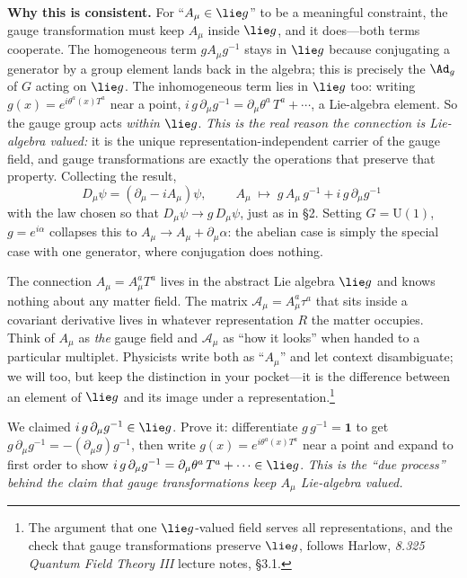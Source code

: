 \documentclass[11pt]{article}
\newcommand{\Uone}{\mathrm{U}(1)}
\begin{document}
\medskip
\noindent\textbf{Why this is consistent.} For ``$A_\mu\in\lie g$'' to be a meaningful
constraint, the gauge transformation must keep $A_\mu$ inside $\lie g$, and it does---both
terms cooperate. The homogeneous term $gA_\mu g^{-1}$ stays in $\lie g$ because
conjugating a generator by a group element lands back in the algebra; this is precisely
the  $\Ad_g$ of $G$ acting on $\lie g$. The inhomogeneous
term lies in $\lie g$ too: writing $g(x)=e^{i\theta^a(x)T^a}$ near a point,
$i\,g\,\partial_\mu g^{-1}=\partial_\mu\theta^a\,T^a+\cdots$, a Lie-algebra element. So the
gauge group acts \emph{within} $\lie g$. \emph{This is the real reason the connection is
Lie-algebra valued:} it is the unique representation-independent carrier of the gauge
field, and gauge transformations are exactly the operations that preserve that property.
Collecting the result,
\[
D_\mu\psi=(\partial_\mu-iA_\mu)\psi,\qquad
\boxed{\;A_\mu\;\longmapsto\;g\,A_\mu\,g^{-1}+i\,g\,\partial_\mu g^{-1}\;}
\]
with the law chosen so that $D_\mu\psi\to g\,D_\mu\psi$, just as in \S2. Setting
$G=\Uone$, $g=e^{i\alpha}$ collapses this to $A_\mu\to A_\mu+\partial_\mu\alpha$: the
abelian case is simply the special case with one generator, where conjugation does
nothing.

\begin{nnote}
The connection $A_\mu=A_\mu^a T^a$ lives in the abstract Lie algebra $\lie g$ and knows
nothing about any matter field. The matrix $\mathcal A_\mu=A_\mu^a\tau^a$ that sits inside
a covariant derivative lives in whatever representation $R$ the matter occupies. Think of
$A_\mu$ as \emph{the} gauge field and $\mathcal A_\mu$ as ``how it looks'' when handed to
a particular multiplet. Physicists write both as ``$A_\mu$'' and let context
disambiguate; we will too, but keep the distinction in your pocket---it is the difference
between an element of $\lie g$ and its image under a representation.\footnote{The argument
that one $\lie g$-valued field serves all representations, and the check that gauge
transformations preserve $\lie g$, follows Harlow, \emph{8.325 Quantum Field Theory III}
lecture notes, \S3.1.}
\end{nnote}

\begin{xca}
We claimed $i\,g\,\partial_\mu g^{-1}\in\lie g$. Prove it: differentiate
$g\,g^{-1}=\mathbf 1$ to get $g\,\partial_\mu g^{-1}=-(\partial_\mu g)g^{-1}$, then write
$g(x)=e^{i\theta^a(x)T^a}$ near a point and expand to first order to show
$i\,g\,\partial_\mu g^{-1}=\partial_\mu\theta^a\,T^a+\dots\in\lie g$. \emph{This is the
``due process'' behind the claim that gauge transformations keep $A_\mu$ Lie-algebra
valued.}
\end{xca}
\end{document}
